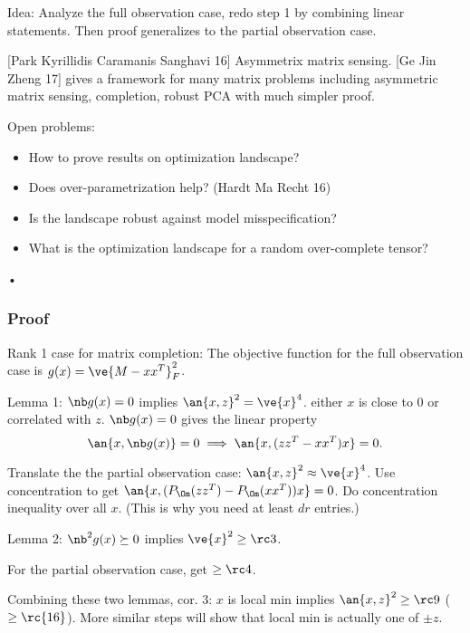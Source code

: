 
Idea: Analyze the full observation case, redo step 1 by combining linear statements. Then proof generalizes to the partial observation case.

[Park Kyrillidis Caramanis Sanghavi 16] Asymmetrix matrix sensing. [Ge Jin Zheng 17] gives a framework for many matrix problems including asymmetric matrix sensing, completion, robust PCA with much simpler proof.

Open problems:
\begin{itemize}
\item
How to prove results on optimization landscape?
\item
Does over-parametrization help? (Hardt Ma Recht 16)
\item
Is the landscape robust against model misspecification?
\item
What is the optimization landscape for a random over-complete tensor?
\end{itemize}•

\subsubsection{Proof}

Rank 1 case for matrix completion: The objective function for the full observation case is $g(x) = \ve{M-xx^T}_F^2$. 

Lemma 1: $\nb g(x)=0$ implies $\an{x,z}^2=\ve{x}^4$. either $x$ is close to 0 or correlated with $z$.
$\nb g(x)=0$ gives the linear property
$$
\an{x,\nb g(x)}=0\implies \an{x,(zz^T-xx^T)x}=0.
$$

Translate the the partial observation case: $\an{x,z}^2 \approx \ve{x}^4$. Use concentration to get $\an{x, (P_\Om(zz^T)-P_\Om(xx^T))x}=0$. Do  concentration inequality over all $x$. (This is why you need at least $dr$ entries.)

Lemma 2: $\nb^2 g(x)\succeq 0$ implies $\ve{x}^2\ge \rc 3$. %

For the partial observation case, get $\ge \rc4$.

Combining these two lemmas, cor. 3: $x$ is local min implies $\an{x,z}^2 \ge \rc 9$ ($\ge \rc{16}$). More similar steps will show that local min is actually one of $\pm z$.


